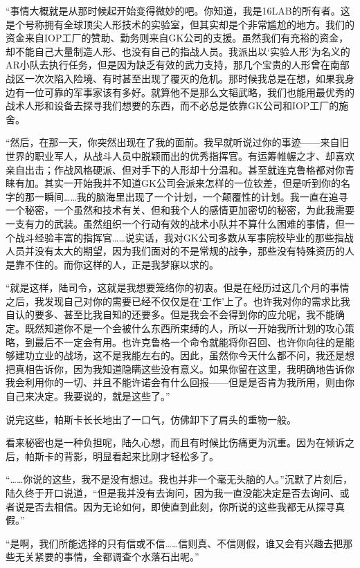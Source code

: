 “事情大概就是从那时候起开始变得微妙的吧。你知道，我是16LAB的所有者。这是个号称拥有全球顶尖人形技术的实验室，但其实却是个非常尴尬的地方。我们的资金来自IOP工厂的赞助、勤务则来自GK公司的支援。虽然我们有充裕的资金，却不能自己大量制造人形、也没有自己的指战人员。我派出以‘实验人形’为名义的AR小队去执行任务，但是因为缺乏有效的武力支持，那几个宝贵的人形曾在南部战区一次次陷入险境、有时甚至出现了覆灭的危机。那时候我总是在想，如果我身边有一位可靠的军事家该有多好。就算他不是那么文韬武略，我们也能用最优秀的战术人形和设备去探寻我们想要的东西，而不必总是依靠GK公司和IOP工厂的施舍。

“然后，在那一天，你突然出现在了我的面前。我早就听说过你的事迹——来自旧世界的职业军人，从战斗人员中脱颖而出的优秀指挥官。有运筹帷幄之才、却喜欢亲自出击；作战风格硬派、但对手下的人形却十分温和。甚至就连克鲁格都对你青睐有加。其实一开始我并不知道GK公司会派来怎样的一位钦差，但是听到你的名字的那一瞬间……我的脑海里出现了一个计划，一个颠覆性的计划。我一直在追寻一个秘密，一个虽然和技术有关、但和我个人的感情更加密切的秘密，为此我需要一支有力的武装。虽然组织一个行动有效的战术小队并不算什么困难的事情，但一个战斗经验丰富的指挥官……说实话，我对GK公司多数从军事院校毕业的那些指战人员并没有太大的期望，因为我们面对的不是常规的战争，那些没有特殊资历的人是靠不住的。而你这样的人，正是我梦寐以求的。

“就是这样，陆司令，这就是我想要笼络你的初衷。但是在经历过这几个月的事情之后，我发现自己对你的需要已经不仅仅是在‘工作’上了。也许我对你的需求比我自认的要多、甚至比我自知的还要多。但是我会不会得到你的应允呢，我不能确定。既然知道你不是一个会被什么东西所束缚的人，所以一开始我所计划的攻心策略，到最后不一定会有用。也许克鲁格一个命令就能将你召回、也许你向往的是能够建功立业的战场，这不是我能左右的。因此，虽然你今天什么都不问，我还是想把真相告诉你，因为我知道隐瞒这些没有意义。如果你留在这里，我明确地告诉你我会利用你的一切、并且不能许诺会有什么回报——但是是否肯为我所用，则由你自己来决定。我要说的，就是这些了。”

说完这些，帕斯卡长长地出了一口气，仿佛卸下了肩头的重物一般。

看来秘密也是一种负担呢，陆久心想，而且有时候比伤痛更为沉重。因为在倾诉之后，帕斯卡的背影，明显看起来比刚才轻松多了。

“……你说的这些，我不是没有想过。我也并非一个毫无头脑的人。”沉默了片刻后，陆久终于开口说道，“但是我并没有去询问，因为我一直没能决定是否去询问、或者说是否去相信。因为无论如何，即使直到此刻，你所说的这些我都无从探寻真假。”

“是啊，我们所能选择的只有信或不信……信则真、不信则假，谁又会有兴趣去把那些无关紧要的事情，全都调查个水落石出呢。”

